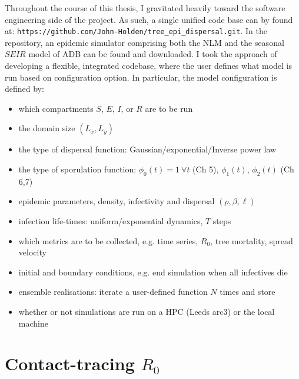 Throughout the course of this thesis, I gravitated heavily toward the software engineering side of the project. 
As such, a single unified code base can by found at: \nolinkurl{https://github.com/John-Holden/tree_epi_dispersal.git}.
In the repository, an epidemic simulator comprising both the NLM and the seasonal $SEIR$ model of ADB can be found and downloaded.
I took the approach of developing a flexible, integrated codebase, where the user defines what model is run based on configuration option.
In particular, the model configuration is defined by:
\begin{itemize}
    \item which compartments $S$, $E$, $I$, or $R$ are to be run
    \item the domain size $(L_x, L_y)$
    \item the type of dispersal function: Gaussian/exponential/Inverse power law
    \item the type of sporulation function: $\phi_0(t) = 1 \ \forall t$ (Ch 5), $\phi_1(t)$, $\phi_2(t)$ (Ch 6,7)
    \item epidemic parameters, density, infectivity and dispersal $(\rho, \beta, \ell)$
    \item infection life-times: uniform/exponential dynamics, $T$ steps
    \item which metrics are to be collected, e.g. time series, $R_0$, tree mortality, spread velocity
    \item initial and boundary conditions, e.g. end simulation when all infectives die 
    \item ensemble realisations: iterate a user-defined function $N$ times and store
    \item whether or not simulations are run on a HPC (Leeds arc3) or the local machine
\end{itemize}

\section{Contact-tracing $R_0$}
\label{A:R0-contact-traced-mortality}

